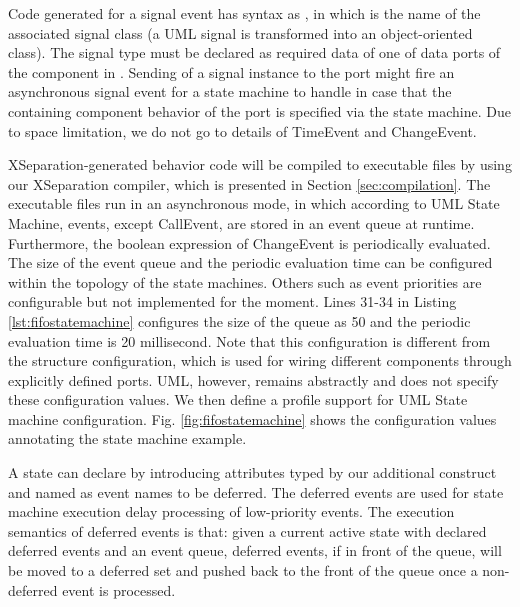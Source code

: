 Code generated for a signal event has syntax as , in which  is the name of the associated signal class (a UML signal is transformed into an object-oriented class).
The signal type must be declared as required data of one of data ports of the component in .
Sending of a signal instance to the port might fire an asynchronous signal event for a state machine to handle in case that the containing component behavior of the port is specified via the state machine.
Due to space limitation, we do not go to details of TimeEvent and ChangeEvent.

\vskip 0.1cm
\noindent
{} 
XSeparation-generated behavior code will be compiled to executable files by using our XSeparation compiler, which is presented in Section \ref{sec:compilation}.
The executable files run in an asynchronous mode, in which according to UML State Machine, events, except CallEvent, are stored in an event queue at runtime.
Furthermore, the boolean expression of ChangeEvent is periodically evaluated.
The size of the event queue and the periodic evaluation time can be configured within the topology of the state machines.
Others such as event priorities are configurable but not implemented for the moment.
Lines 31-34 in Listing \ref{lst:fifostatemachine} configures the size of the queue as 50 and the periodic evaluation time is 20 millisecond.
Note that this configuration is different from the structure configuration, which is used for wiring different components through explicitly defined ports.
UML, however, remains abstractly and does not specify these configuration values.
We then define a profile support for UML State machine configuration.
Fig. \ref{fig:fifostatemachine} shows the configuration values annotating the state machine example. 

\vskip 0.1cm
\noindent
{}
A state can declare  by introducing attributes typed by our additional construct  and named as event names to be deferred.
The deferred events are used for state machine execution delay processing of low-priority events.
The execution semantics of deferred events is that: given a current active state with declared deferred events and an event queue, deferred events, if in front of the queue, will be moved to a deferred set and pushed back to the front of the queue once a non-deferred event is processed.

